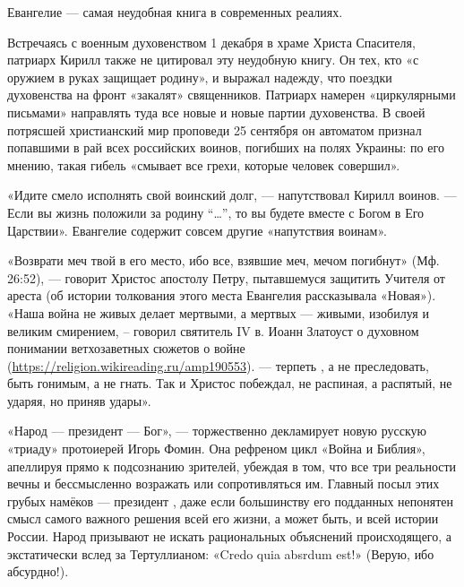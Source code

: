 \begin{fancyquotes}
    Евангелие — самая неудобная книга в современных реалиях.
\end{fancyquotes}

Встречаясь с военным духовенством 1 декабря в храме Христа Спасителя, патриарх Кирилл также не цитировал эту неудобную книгу. Он   тех, кто «с оружием в руках защищает родину», и выражал надежду, что поездки духовенства на фронт «закалят» священников. Патриарх намерен «циркулярными письмами» направлять туда все новые и новые партии духовенства. В своей потрясшей христианский мир проповеди 25 сентября он автоматом признал попавшими в рай всех российских воинов, погибших на полях Украины: по его мнению, такая гибель «смывает все грехи, которые человек совершил».

\begin{fancyquotes}
    «Идите смело исполнять свой воинский долг, — напутствовал Кирилл воинов. — Если вы жизнь положили за родину ``\dots'', то вы будете вместе с Богом в Его Царствии».
    Евангелие содержит совсем другие «напутствия воинам».
\end{fancyquotes}

«Возврати меч твой в его место, ибо все, взявшие меч, мечом погибнут» (Мф. 26:52), — говорит Христос апостолу Петру, пытавшемуся защитить Учителя от ареста (об истории толкования этого места Евангелия рассказывала «Новая»). «Наша война не живых делает мертвыми, а мертвых — живыми, изобилуя  и великим смирением, -- говорил святитель IV в. Иоанн Златоуст о духовном понимании ветхозаветных сюжетов о войне (\url{https://religion.wikireading.ru/amp190553}). —  терпеть , а не преследовать, быть гонимым, а не гнать. Так и Христос побеждал, не распиная, а распятый, не ударяя, но приняв удары».

«Народ — президент — Бог», --- торжественно декламирует новую русскую «триаду» протоиерей Игорь Фомин. Она рефреном  цикл «Война и Библия», апеллируя прямо к подсознанию зрителей, убеждая в том, что все три реальности вечны и бессмысленно возражать или сопротивляться им. Главный посыл этих грубых намёков --- президент , даже если большинству его подданных непонятен смысл самого важного решения всей его жизни, а может быть, и всей истории России. Народ призывают не искать рациональных объяснений происходящего, а экстатически  вслед за Тертуллианом: «Credo quia absrdum est!» (Верую, ибо абсурдно!).


